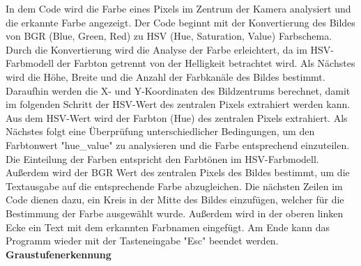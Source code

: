 {In dem Code wird die Farbe eines Pixels im Zentrum der Kamera analysiert und die erkannte Farbe angezeigt.
Der Code beginnt mit der Konvertierung des Bildes von BGR (Blue, Green, Red) zu HSV (Hue, Saturation, Value) Farbschema. Durch die Konvertierung wird die Analyse der Farbe erleichtert, da im HSV-Farbmodell der Farbton getrennt von der Helligkeit betrachtet wird. Als Nächstes wird die Höhe, Breite und die Anzahl der Farbkanäle des Bildes bestimmt. Daraufhin werden die X- und Y-Koordinaten des Bildzentrums berechnet, damit im folgenden Schritt der HSV-Wert des zentralen Pixels extrahiert werden kann. Aus dem HSV-Wert wird der Farbton (Hue) des zentralen Pixels extrahiert. Als Nächstes folgt eine Überprüfung unterschiedlicher Bedingungen, um den Farbtonwert "hue\_value" zu analysieren und die Farbe entsprechend einzuteilen. Die Einteilung der Farben entspricht den Farbtönen im HSV-Farbmodell.\\
Außerdem wird der BGR Wert des zentralen Pixels des Bildes bestimmt, um die Textausgabe auf die entsprechende Farbe abzugleichen. 
Die nächsten Zeilen im Code dienen dazu, ein Kreis in der Mitte des Bildes einzufügen, welcher für die Bestimmung der Farbe ausgewählt wurde. Außerdem wird in der oberen linken Ecke ein Text mit dem erkannten Farbnamen eingefügt. Am Ende kann das Programm wieder mit der Tasteneingabe "Esc" beendet werden.\\


\textbf{Graustufenerkennung}\\

}
